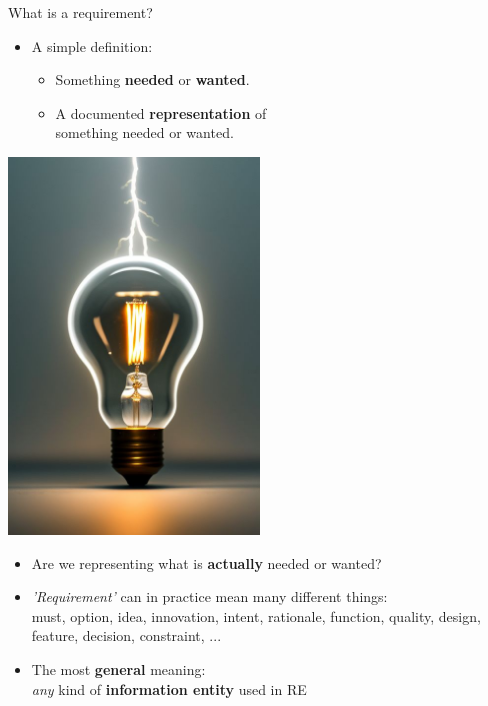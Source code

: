 
\begin{Slide}{What is a requirement?}

\begin{minipage}[t]{0.65\textwidth}
\begin{itemize}
\item A simple definition:
\begin{itemize}
\item Something \textbf{needed} or \textbf{wanted}.
\item A documented \textbf{representation} of\\something needed or wanted.
\end{itemize}
\end{itemize}
\end{minipage}%
\begin{minipage}[t]{0.35\textwidth}
\vspace{-1em}\hfill\includegraphics[width=0.5\textwidth]{../img/light-bulb}
\end{minipage}%

\begin{itemize}
\item Are we representing what is \textbf{actually} needed or wanted? 

\item \textit{'Requirement'} can in practice mean many different things:\\
  must, option, idea, innovation, intent, rationale, function, quality, design, feature, decision, constraint, ...

\item The most \textbf{general} meaning:\\
  \textit{any} kind of \textbf{information entity} used in RE

\end{itemize}
\end{Slide}